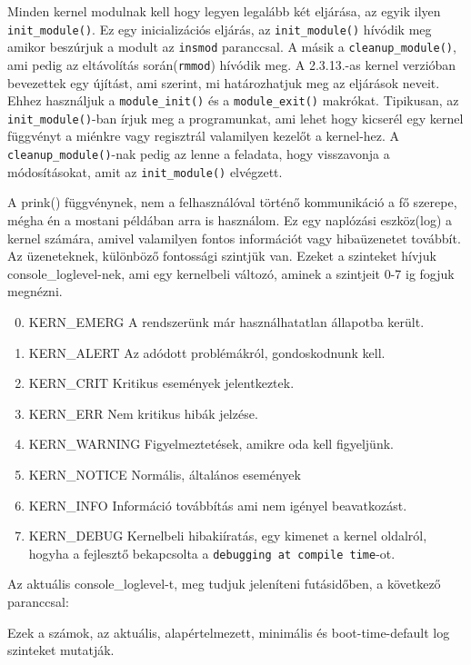 Minden kernel modulnak kell hogy legyen legalább két eljárása, az egyik ilyen \texttt{init\_module()}.
Ez egy inicializációs eljárás, az \texttt{init\_module()} hívódik meg amikor beszúrjuk a modult az \texttt{insmod} paranccsal.
A másik a \texttt{cleanup\_module()}, ami pedig az eltávolítás során(\texttt{rmmod}) hívódik meg.
A 2.3.13.-as kernel verzióban bevezettek egy újítást, ami szerint, mi határozhatjuk meg az eljárások neveit. Ehhez használjuk a \texttt{module\_init()} és a \texttt{module\_exit()} makrókat. Tipikusan, az \texttt{init\_module()}-ban írjuk meg a programunkat, ami lehet hogy kicserél egy kernel függvényt a miénkre vagy regisztrál valamilyen kezelőt a kernel-hez. A \texttt{cleanup\_module()}-nak pedig az lenne a feladata, hogy visszavonja a módosításokat, amit az \texttt{init\_module()} elvégzett.

A prink() függvénynek, nem a felhasználóval történő kommunikáció a fő szerepe, mégha én a mostani példában arra is használom. Ez egy naplózási eszköz(log) a kernel számára, amivel valamilyen fontos információt vagy hibaüzenetet továbbít. Az üzeneteknek, különböző fontossági szintjük van. Ezeket a szinteket hívjuk console\_loglevel-nek, ami egy kernelbeli változó, aminek a szintjeit 0-7 ig fogjuk megnézni. 
\begin{enumerate}
\setcounter{enumi}{-1}
	\item KERN\_EMERG \- A rendszerünk már használhatatlan állapotba került.
	\item KERN\_ALERT \- Az adódott problémákról, gondoskodnunk kell.
	\item KERN\_CRIT \- Kritikus események jelentkeztek.
	\item KERN\_ERR \- Nem kritikus hibák jelzése.
	\item KERN\_WARNING	\- Figyelmeztetések, amikre oda kell figyeljünk.
	\item KERN\_NOTICE \- Normális, általános események
	\item KERN\_INFO \- Információ továbbítás ami nem igényel beavatkozást.
	\item KERN\_DEBUG \- Kernelbeli hibakiíratás, egy kimenet a kernel oldalról, hogyha a fejlesztő bekapcsolta a \texttt{debugging at compile time}-ot.
\end{enumerate}
Az aktuális console\_loglevel-t, meg tudjuk jeleníteni futásidőben, a következő paranccsal:
Ezek a számok, az aktuális, alapértelmezett, minimális és boot-time-default log szinteket mutatják.




